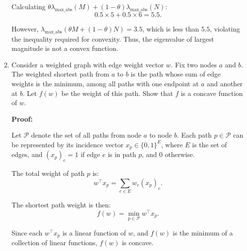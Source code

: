 \documentclass{article}
\begin{document}
\begin{enumerate}[label=(\alph*)]
Calculating $\theta \lambda_{\text{max\_abs}}(M) + (1-\theta) \lambda_{\text{max\_abs}}(N)$:
\[0.5 \times 5 + 0.5 \times 6 = 5.5.\]

However, $\lambda_{\text{max\_abs}}(\theta M + (1-\theta) N) = 3.5$, which is less than $5.5$, violating the inequality required for convexity. Thus, the eigenvalue of largest magnitude is not a convex function.

\item Consider a weighted graph with edge weight vector $w$. Fix two nodes $a$ and $b$. The weighted shortest path from $a$ to $b$ is the path whose sum of edge weights is the minimum, among all paths with one endpoint at $a$ and another at $b$. Let $f(w)$ be the weight of this path. Show that $f$ is a concave function of $w$.

\textbf{Proof:}

Let $\mathcal{P}$ denote the set of all paths from node $a$ to node $b$. Each path $p \in \mathcal{P}$ can be represented by its incidence vector $x_p \in \{0,1\}^E$, where $E$ is the set of edges, and $(x_p)_e = 1$ if edge $e$ is in path $p$, and $0$ otherwise.

The total weight of path $p$ is:
\[w^\top x_p = \sum_{e \in E} w_e (x_p)_e.\]

The shortest path weight is then:
\[f(w) = \min_{p \in \mathcal{P}} w^\top x_p.\]

Since each $w^\top x_p$ is a linear function of $w$, and $f(w)$ is the minimum of a collection of linear functions, $f(w)$ is concave.

\end{enumerate}
\end{document}
